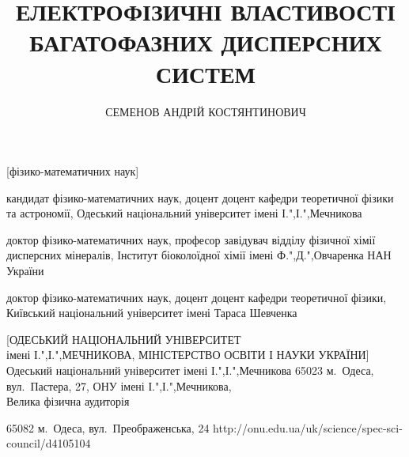 \documentclass[twoside,a4paper,14pt]{vakaref}
\begin{document}
\setlength{\abovedisplayskip}{4pt}%
\setlength{\abovedisplayshortskip}{4pt}%
\setlength{\belowdisplayskip}{4pt}%
\setlength{\belowdisplayshortskip}{4pt}%

\author{СЕМЕНОВ АНДРІЙ КОСТЯНТИНОВИЧ}


\title{ЕЛЕКТРОФІЗИЧНІ ВЛАСТИВОСТІ\\ БАГАТОФАЗНИХ
ДИСПЕРСНИХ СИСТЕМ}

[фізико-математичних наук]

  {кандидат фізико-математичних наук, доцент}
  {доцент кафедри теоретичної фізики та астрономії, 
  Одеський національний університет імені І.",І.",Мечникова}


  {доктор фізико-математичних наук, професор}
  {завідувач відділу фізичної хімії дисперсних мінералів, Інститут біоколоїдної хімії імені {Ф.",Д.",Овчаренка} НАН України}

  {доктор фізико-математичних наук, доцент}
  {доцент кафедри теоретичної фізики, Київський національний університет імені Тараса Шевченка}

  [ОДЕСЬКИЙ НАЦІОНАЛЬНИЙ УНІВЕРСИТЕТ\\ імені {І.",І.",МЕЧНИКОВА}, МІНІСТЕРСТВО ОСВІТИ І НАУКИ УКРАЇНИ]
  {Одеський національний університет імені {І.",І.",Мечникова}}
  {65023 м.~Одеса, вул.~Пастера, 27, ОНУ імені {І.",І.",Мечникова},\\ Велика фізична аудиторія}
  

  {65082 м.~Одеса, вул.~Преображенська, 24}
  {http://onu.edu.ua/uk/science/spec-sci-council/d4105104}



\maketitle
\end{document}

